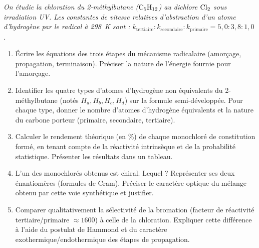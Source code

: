 \documentclass[11pt]{article}
\begin{document}
\begin{exercice}
\emph{On étudie la chloration du 2-méthylbutane ($\ce{C5H12}$) au dichlore $\ce{Cl2}$ sous irradiation UV. Les constantes de vitesse relatives d'abstraction d'un atome d'hydrogène par le radical  à \SI{298}{\kelvin} sont : $k_{\text{tertiaire}} : k_{\text{secondaire}} : k_{\text{primaire}} = 5,0 : 3,8 : 1,0$.}
\begin{enumerate}
    \item Écrire les équations des trois étapes du mécanisme radicalaire (amorçage, propagation, terminaison). Préciser la nature de l'énergie fournie pour l'amorçage.
    \item Identifier les quatre types d'atomes d'hydrogène non équivalents du 2-méthylbutane (notés $H_a, H_b, H_c, H_d$) sur la formule semi-développée. Pour chaque type, donner le nombre d'atomes d'hydrogène équivalents et la nature du carbone porteur (primaire, secondaire, tertiaire).
    \item Calculer le rendement théorique (en \%) de chaque monochloré de constitution formé, en tenant compte de la réactivité intrinsèque et de la probabilité statistique. Présenter les résultats dans un tableau.
    \item L'un des monochlorés obtenus est chiral. Lequel ? Représenter ses deux énantiomères (formules de Cram). Préciser le caractère optique du mélange obtenu par cette voie synthétique et justifier.
    \item Comparer qualitativement la sélectivité de la bromation (facteur de réactivité tertiaire/primaire $\approx 1600$) à celle de la chloration. Expliquer cette différence à l'aide du postulat de Hammond et du caractère exothermique/endothermique des étapes de propagation.
\end{enumerate}
\end{exercice}
\end{document}
